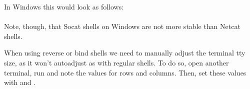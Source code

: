 {\begin{enumerate}
In Windows this would look as follows:\\
\\
Note, though, that Socat shells on Windows are not more stable than Netcat shells.
\end{enumerate}
When using reverse or bind shells we need to manually adjust the terminal tty size, as it won't autoadjust as with regular shells. To do so, open another terminal, run  and note the values for rows and columns. Then, set these values with  and .

}
